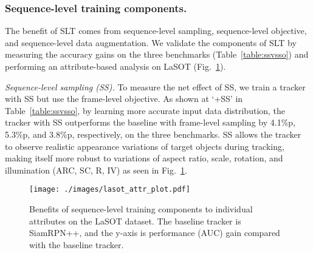 \subsubsection{Sequence-level training components.}
The benefit of SLT comes from sequence-level sampling, sequence-level objective, and sequence-level data augmentation.
We validate the components of SLT by measuring the accuracy gains on the three benchmarks (Table~\ref{table:ssvsso}) and performing an attribute-based analysis on LaSOT (Fig.~\ref{fig:small_attr}).

\textit{Sequence-level sampling (SS).}
To measure the net effect of SS, we train a tracker with SS but use the frame-level objective.
As shown at `+SS' in Table~\ref{table:ssvsso}, by learning more accurate input data distribution, the tracker with SS outperforms the baseline with frame-level sampling by 4.1\%p, 5.3\%p, and 3.8\%p, respectively, on the three benchmarks. SS allows the tracker to observe realistic appearance variations of target objects during tracking, making itself more robust to variations of aspect ratio, scale, rotation, and illumination (ARC, SC, R, IV) as seen in Fig.~\ref{fig:small_attr}.



\begin{table*}[t]
\centering
\caption{
Effect of sequence-level training components.
}
\label{table:ssvsso}
\end{table*}


\begin{figure}[t]
\centering
\texttt{[image: ./images/lasot\_attr\_plot.pdf]}
\caption{
Benefits of sequence-level training components to individual attributes on the LaSOT dataset.
The baseline tracker is SiamRPN++, and the y-axis is performance (AUC) gain compared with the baseline tracker.
}
\label{fig:small_attr}
\end{figure}



